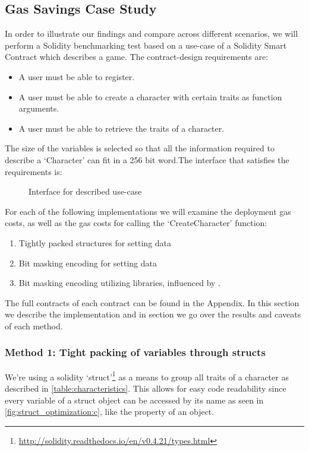 \subsection{Gas Savings Case Study}
In order to illustrate our findings and compare across different scenarios, we will perform a Solidity benchmarking test based on a use-case of a Solidity Smart Contract which describes a game. The contract-design requirements are: 
\begin{itemize}
    \item A user must be able to register.
    \item A user must be able to create a character with certain traits as function arguments.
    \item A user must be able to retrieve the traits of a character.
\end{itemize}



The size of the variables is selected so that all the information required to describe a `Character' can fit in a 256 bit word.The interface that satisfies the requirements is:

\begin{figure}[H]
    \centering
    
    \label{fig:game_interface}
    \caption{Interface for described use-case}
\end{figure}


For each of the following implementations we will examine the deployment gas costs, as well as the gas costs for calling the `CreateCharacter' function:

\begin{enumerate}
    \item Tightly packed structures for setting data
    \item Bit masking encoding for setting data
    \item Bit masking encoding utilizing libraries, influenced by \cite{virtualstruct}.
\end{enumerate}

The full contracts of each contract can be found in the Appendix. In this section we describe the implementation and in section \label{results} we go over the results and caveats of each method.

\subsubsection{Method 1: Tight packing of variables through structs} \label{method1}
We're using a solidity `struct'\footnote{\url{http://solidity.readthedocs.io/en/v0.4.21/types.html}} as a means to group all traits of a character as described in \ref{table:characteristics}. This allows for easy code readability since every variable of a struct object can be accessed by its name as seen in \ref{fig:struct_optimization:c}, like the property of an object. 

